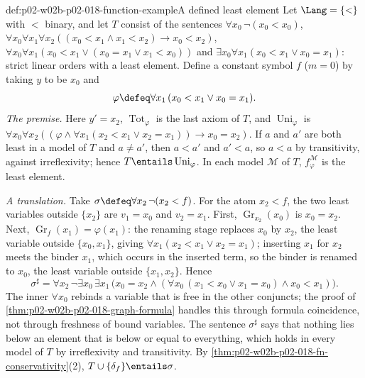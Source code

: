 \begin{hbexample}{def:p02-w02b-p02-018-function-example}{A defined least element}
Let \(\Lang=\{<\}\) with \(<\) binary, and let \(T\) consist of the
sentences \(\forall x_0\,\neg(x_0<x_0)\),
\(\forall x_0\forall x_1\forall x_2((x_0<x_1\land x_1<x_2)\to x_0<x_2)\),
\(\forall x_0\forall x_1(x_0<x_1\lor(x_0=x_1\lor x_1<x_0))\) and
\(\exists x_0\forall x_1(x_0<x_1\lor x_0=x_1)\): strict linear orders with a
least element.  Define a constant symbol \(f\) (\(m=0\)) by taking \(y\) to
be \(x_0\) and
\[
 \varphi\defeq\forall x_1\,(x_0<x_1\lor x_0=x_1).
\]
\emph{The premise.}  Here \(y'=x_2\), \(\operatorname{Tot}_{\varphi}\) is the
last axiom of \(T\), and \(\operatorname{Uni}_{\varphi}\) is
\(\forall x_0\forall x_2((\varphi\land\forall x_1(x_2<x_1\lor x_2=x_1))\to
x_0=x_2)\).  If \(a\) and \(a'\) are both least in a model of \(T\) and
\(a\ne a'\), then \(a<a'\) and \(a'<a\), so \(a<a\) by transitivity,
against irreflexivity; hence \(T\entails\operatorname{Uni}_{\varphi}\).
In each model \(\mathcal M\) of \(T\), \(f^{\mathcal M}_{\varphi}\) is the
least element.

\emph{A translation.}  Take \(\sigma\defeq\forall x_2\,\neg(x_2<f)\).  For the
atom \(x_2<f\), the two least variables outside \(\{x_2\}\) are
\(v_1=x_0\) and \(v_2=x_1\).  First, \(\operatorname{Gr}_{x_2}(x_0)\) is
\(x_0=x_2\).  Next, \(\operatorname{Gr}_{f}(x_1)=\varphi(x_1)\): the renaming
stage replaces \(x_0\) by \(x_2\), the least variable outside
\(\{x_0,x_1\}\), giving \(\forall x_1(x_2<x_1\lor x_2=x_1)\); inserting
\(x_1\) for \(x_2\) meets the binder \(x_1\), which occurs in the inserted
term, so the binder is renamed to \(x_0\), the least variable outside
\(\{x_1,x_2\}\).  Hence
\[
 \sigma^{\sharp}=\forall x_2\,\neg\exists x_0\,\exists x_1\,
 \bigl(x_0=x_2\land(\forall x_0\,(x_1<x_0\lor x_1=x_0)\land x_0<x_1)\bigr).
\]
The inner \(\forall x_0\) rebinds a variable that is free in the other
conjuncts; the proof of \cref{thm:p02-w02b-p02-018-graph-formula} handles
this through formula coincidence, not through freshness of bound variables.
The sentence \(\sigma^{\sharp}\) says that nothing lies below an element
that is below or equal to everything, which holds in every model of \(T\)
by irreflexivity and transitivity.  By \cref{thm:p02-w02b-p02-018-fn-conservativity}(2),
\(T\cup\{\delta_f\}\entails\sigma\).
\end{hbexample}

